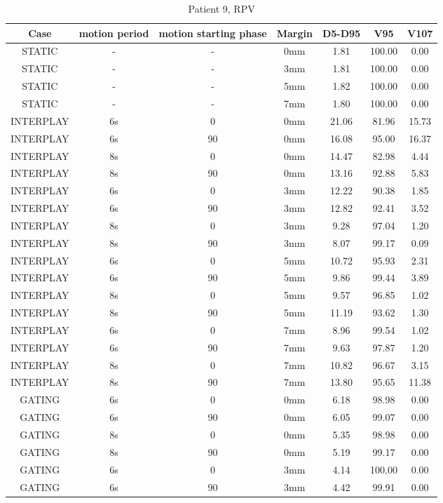 \begin{table}[H]
  \centering
  \caption{Patient 9, RPV}
  \begin{tabular}{|c||c|c|c||c|c|c|}
    \hline\hline
    Case & motion period & motion starting phase & Margin & D5-D95 & V95 & V107\\
    \hline 
STATIC & - & - & 0mm & 1.81 & 100.00 & 0.00 \\
STATIC & - & - & 3mm & 1.81 & 100.00 & 0.00 \\
STATIC & - & - & 5mm & 1.82 & 100.00 & 0.00 \\
STATIC & - & - & 7mm & 1.80 & 100.00 & 0.00 \\
INTERPLAY & 6s & 0 & 0mm & 21.06 & 81.96 & 15.73 \\
INTERPLAY & 6s & 90 & 0mm & 16.08 & 95.00 & 16.37 \\
INTERPLAY & 8s & 0 & 0mm & 14.47 & 82.98 & 4.44 \\
INTERPLAY & 8s & 90 & 0mm & 13.16 & 92.88 & 5.83 \\
INTERPLAY & 6s & 0 & 3mm & 12.22 & 90.38 & 1.85 \\
INTERPLAY & 6s & 90 & 3mm & 12.82 & 92.41 & 3.52 \\
INTERPLAY & 8s & 0 & 3mm & 9.28 & 97.04 & 1.20 \\
INTERPLAY & 8s & 90 & 3mm & 8.07 & 99.17 & 0.09 \\
INTERPLAY & 6s & 0 & 5mm & 10.72 & 95.93 & 2.31 \\
INTERPLAY & 6s & 90 & 5mm & 9.86 & 99.44 & 3.89 \\
INTERPLAY & 8s & 0 & 5mm & 9.57 & 96.85 & 1.02 \\
INTERPLAY & 8s & 90 & 5mm & 11.19 & 93.62 & 1.30 \\
INTERPLAY & 6s & 0 & 7mm & 8.96 & 99.54 & 1.02 \\
INTERPLAY & 6s & 90 & 7mm & 9.63 & 97.87 & 1.20 \\
INTERPLAY & 8s & 0 & 7mm & 10.82 & 96.67 & 3.15 \\
INTERPLAY & 8s & 90 & 7mm & 13.80 & 95.65 & 11.38 \\
GATING & 6s & 0 & 0mm & 6.18 & 98.98 & 0.00 \\
GATING & 6s & 90 & 0mm & 6.05 & 99.07 & 0.00 \\
GATING & 8s & 0 & 0mm & 5.35 & 98.98 & 0.00 \\
GATING & 8s & 90 & 0mm & 5.19 & 99.17 & 0.00 \\
GATING & 6s & 0 & 3mm & 4.14 & 100.00 & 0.00 \\
GATING & 6s & 90 & 3mm & 4.42 & 99.91 & 0.00 \\

\end{tabular}
\end{table}
